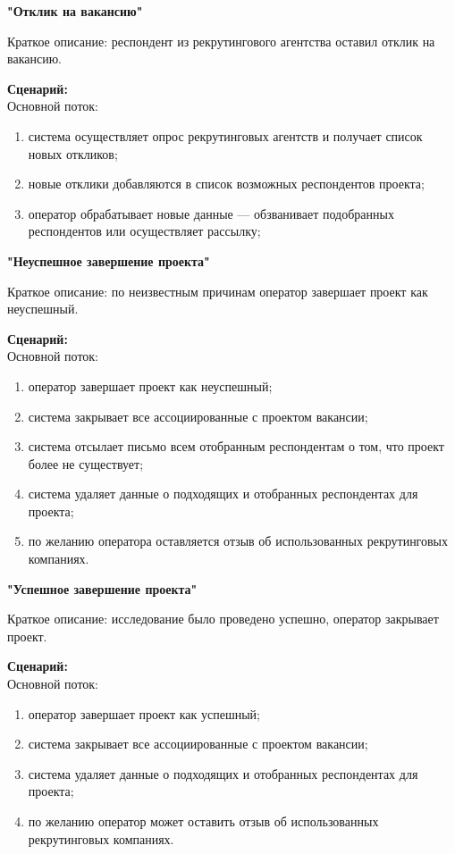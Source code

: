 \textbf{"Отклик на вакансию"}

Краткое описание: респондент из рекрутингового агентства оставил отклик на вакансию.

\textbf{Сценарий:}\\
Основной поток:
\begin{enumerate}
\item система осуществляет опрос рекрутинговых агентств и получает список новых откликов;
\item новые отклики добавляются в список возможных респондентов проекта;
\item оператор обрабатывает новые данные — обзванивает подобранных респондентов или осуществляет рассылку;
\end{enumerate} 

\textbf{"Неуспешное завершение проекта"}

Краткое описание: по неизвестным причинам оператор завершает проект как неуспешный.

\textbf{Сценарий:}\\
Основной поток:
\begin{enumerate}
\item оператор завершает проект как неуспешный;
\item система закрывает все ассоциированные с проектом вакансии;
\item система отсылает письмо всем отобранным респондентам о том, что проект более не существует;
\item система удаляет данные о подходящих и отобранных респондентах для проекта;
\item по желанию оператора оставляется отзыв об использованных рекрутинговых компаниях.
\end{enumerate}

\textbf{"Успешное завершение проекта"}

Краткое описание: исследование было проведено успешно, оператор закрывает проект.

\textbf{Сценарий:}\\
Основной поток:
\begin{enumerate}
\item оператор завершает проект как успешный;
\item система закрывает все ассоциированные с проектом вакансии;
\item система удаляет данные о подходящих и отобранных респондентах для проекта;
\item по желанию оператор может оставить отзыв об использованных рекрутинговых компаниях.
\end{enumerate}

